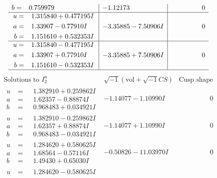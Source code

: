 \documentclass[1p]{elsarticle_modified}
\theoremstyle{definition}
\newcommand{\I}{\sqrt{-1}}
\begin{document}
$$\begin{array}{c|c|c}
\begin{aligned}
b &= \phantom{-}0.759979\phantom{ +0.000000I}\end{aligned}
 & -1.12173\phantom{ +0.000000I} & \phantom{-0.000000 } 0 \\ \hline\begin{aligned}
u &= \phantom{-}1.315840 + 0.477195 I \\
a &= \phantom{-}1.33907 - 0.77910 I \\
b &= \phantom{-}1.151610 + 0.532353 I\end{aligned}
 & -3.35885 - 7.50906 I & \phantom{-0.000000 } 0 \\ \hline\begin{aligned}
u &= \phantom{-}1.315840 - 0.477195 I \\
a &= \phantom{-}1.33907 + 0.77910 I \\
b &= \phantom{-}1.151610 - 0.532353 I\end{aligned}
 & -3.35885 + 7.50906 I & \phantom{-0.000000 } 0\\
 \hline 
 \end{array}$$\newpage$$\begin{array}{c|c|c}  
\text{Solutions to }I^u_{2}& \I (\text{vol} + \sqrt{-1}CS) & \text{Cusp shape}\\
 \hline 
\begin{aligned}
u &= \phantom{-}1.382910 + 0.259862 I \\
a &= \phantom{-}1.62357 - 0.88874 I \\
b &= \phantom{-}0.968483 + 0.034921 I\end{aligned}
 & -1.14077 - 1.10990 I & \phantom{-0.000000 } 0 \\ \hline\begin{aligned}
u &= \phantom{-}1.382910 - 0.259862 I \\
a &= \phantom{-}1.62357 + 0.88874 I \\
b &= \phantom{-}0.968483 - 0.034921 I\end{aligned}
 & -1.14077 + 1.10990 I & \phantom{-0.000000 } 0 \\ \hline\begin{aligned}
u &= \phantom{-}1.284620 + 0.580625 I \\
a &= \phantom{-}1.68564 - 0.57116 I \\
b &= \phantom{-}1.49430 + 0.65030 I\end{aligned}
 & -0.50826 - 11.03970 I & \phantom{-0.000000 } 0 \\ \hline\begin{aligned}
u &= \phantom{-}1.284620 - 0.580625 I \\

\end{aligned}
\end{array}$$
\end{document}
